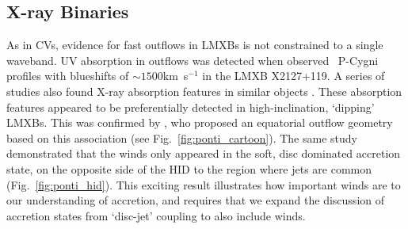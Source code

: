 

\subsection{X-ray Binaries}
\label{sec:xrb_winds}

As in CVs, evidence for fast outflows in LMXBs is not constrained to 
a single waveband. UV absorption in outflows was detected when
\cite{ioannau2003} observed \civfull\ P-Cygni profiles with blueshifts 
of $\sim1500$km~s$^{-1}$ in the LMXB X2127+119. 
A series of studies also found X-ray absorption features in similar objects 
\citep{ueda1998,kotani2000,parmar2002}. 
These absorption features appeared to be preferentially detected
in high-inclination, `dipping' LMXBs. This was confirmed
by \cite{ponti2012}, who proposed an equatorial outflow 
geometry based on this association (see Fig.~\ref{fig:ponti_cartoon}). 
The same study demonstrated that
the winds only appeared in the soft, 
disc dominated accretion state, on the opposite side of the HID to the
region where jets are common (Fig.~\ref{fig:ponti_hid}). 
This exciting result illustrates how
important winds are to our understanding of accretion, and requires that
we expand the discussion of accretion states from `disc-jet' coupling
to also include winds.

